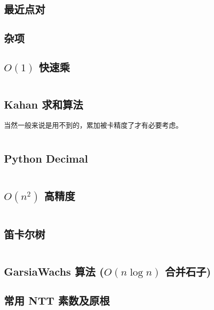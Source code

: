 \documentclass[a4paper, twoside]{article}
\begin{document}
			\subsection{最近点对}
				

		\newpage
	
	\begin{multicols}{2}
		\section{杂项}
			\subsection{$O(1)$ 快速乘}

				\inputminted{cpp}{../src/misc/O(1)快速乘.cpp}
			
			\subsection[Kahan 求和算法（减少浮点数累加的误差）]{Kahan 求和算法}
				当然一般来说是用不到的，累加被卡精度了才有必要考虑。
				\inputminted{cpp}{../src/misc/kahan.cpp}
			
			\subsection{Python Decimal}
				\inputminted{python}{../src/misc/decimal.py}
			
			\subsection{$O(n^2)$ 高精度}
				\inputminted{cpp}{../src/misc/高精度.cpp}
			
			\subsection{笛卡尔树}
				\inputminted{cpp}{../src/misc/笛卡尔树.cpp}
			
			\subsection{GarsiaWachs 算法 ($O(n\log n)$ 合并石子)}
				
			
			\subsection{常用 NTT 素数及原根}
				


\end{multicols}
\end{document}
